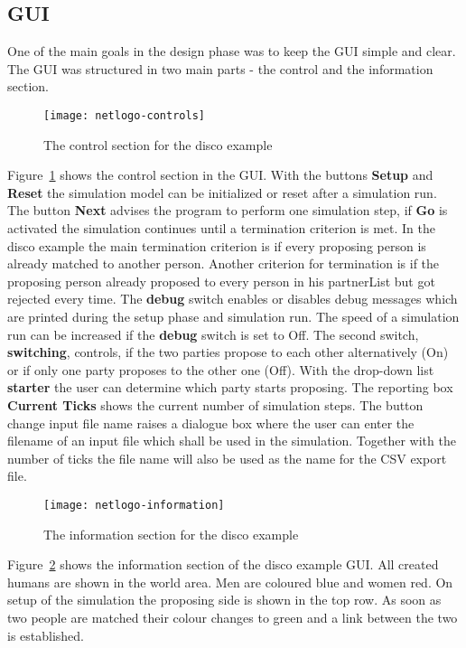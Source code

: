 \subsection{GUI}
One of the main goals in the design phase was to keep the GUI simple and clear.
The GUI was structured in two main parts - the control and the information section.
\begin{figure}[H]	
  \centering
  \texttt{[image: netlogo-controls]}
	\caption{The control section for the disco example}
	\label{fig:control-disco-gui}
\end{figure}
Figure~\ref{fig:control-disco-gui} shows the control section in the GUI. 
With the buttons \textbf{Setup} and \textbf{Reset} the simulation model can be initialized or reset after a simulation run.
The button \textbf{Next} advises the program to perform one simulation step, if \textbf{Go} is activated the simulation continues until a termination criterion is met.
In the disco example the main termination criterion is if every proposing person is already matched to another person. 
Another criterion for termination is if the proposing person already proposed to every person in his partnerList but got rejected every time.
The \textbf{debug} switch enables or disables debug messages which are printed during the setup phase and simulation run.
The speed of a simulation run can be increased if the \textbf{debug} switch is set to Off.
The second switch, \textbf{switching}, controls, if the two parties propose to each other alternatively (On) or if only one party proposes to the other one (Off).
With the drop-down list \textbf{starter} the user can determine which party starts proposing.
The reporting box \textbf{Current Ticks} shows the current number of simulation steps.
The button change input file name raises a dialogue box where the user can enter the filename of an input file which shall be used in the simulation.
Together with the number of ticks the file name will also be used as the name for the CSV export file.
\begin{figure}[H]
  \centering
  \texttt{[image: netlogo-information]}
	\caption{The information section for the disco example}
	\label{fig:info-disco-gui}
\end{figure}
Figure~\ref{fig:info-disco-gui} shows the information section of the disco example GUI. 
All created humans are shown in the world area. 
Men are coloured blue and women red.
On setup of the simulation the proposing side is shown in the top row. 
As soon as two people are matched their colour changes to green and a link between the two is established.
